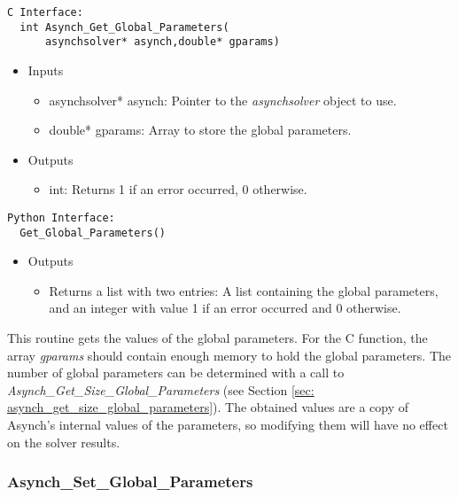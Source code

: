 \documentclass[12pt]{article}
\begin{document}
\begin{lstlisting}[style=CStyle]
  C Interface:
  int Asynch_Get_Global_Parameters(
	  asynchsolver* asynch,double* gparams)
\end{lstlisting}
\begin{itemize}
 \item Inputs
  \begin{itemize}
   \item asynchsolver* asynch: Pointer to the \emph{asynchsolver} object to use.
   \item double* gparams: Array to store the global parameters.
  \end{itemize}
 \item Outputs
  \begin{itemize}
   \item int: Returns 1 if an error occurred, 0 otherwise.
  \end{itemize}
\end{itemize}
\begin{lstlisting}[style=PythonStyle]
  Python Interface:
  Get_Global_Parameters()
\end{lstlisting}
\begin{itemize}
 \item Outputs
  \begin{itemize}
   \item Returns a list with two entries: A list containing the global parameters, and an integer with value 1 if an error occurred and 0 otherwise.
  \end{itemize}
\end{itemize}
This routine gets the values of the global parameters. For the C function, the array \emph{gparams} should contain enough memory to hold the global parameters. The number of global parameters can be determined with a call to \emph{Asynch\_Get\_Size\_Global\_Parameters} (see Section \ref{sec: asynch_get_size_global_parameters}). The obtained values are a copy of Asynch's internal values of the parameters, so modifying them will have no effect on the solver results.


\subsubsection{Asynch\_Set\_Global\_Parameters} \label{sec: asynch_set_global_parameters}
\end{document}
